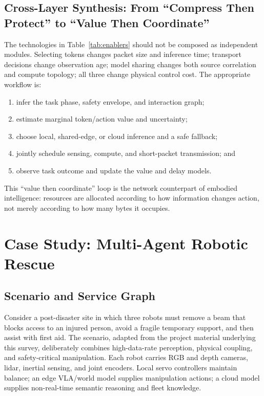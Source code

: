 \documentclass[letterpaper,journal]{IEEEtran}
\begin{document}
\subsection{Cross-Layer Synthesis: From ``Compress Then Protect'' to ``Value Then Coordinate''}
The technologies in Table~\ref{tab:enablers} should not be composed as
independent modules. Selecting tokens changes packet size and inference time;
transport decisions change observation age; model sharing changes both source
correlation and compute topology; all three change physical control cost.
The appropriate workflow is:
\begin{enumerate}
\item infer the task phase, safety envelope, and interaction graph;
\item estimate marginal token/action value and uncertainty;
\item choose local, shared-edge, or cloud inference and a safe fallback;
\item jointly schedule sensing, compute, and short-packet transmission; and
\item observe task outcome and update the value and delay models.
\end{enumerate}
This ``value then coordinate'' loop is the network counterpart of embodied
intelligence: resources are allocated according to how information changes
action, not merely according to how many bytes it occupies.

\section{Case Study: Multi-Agent Robotic Rescue}
\label{sec:case}

\subsection{Scenario and Service Graph}
Consider a post-disaster site in which three robots must remove a beam that
blocks access to an injured person, avoid a fragile temporary support, and
then assist with first aid. The scenario, adapted from the project material
underlying this survey, deliberately combines high-data-rate perception,
physical coupling, and safety-critical manipulation. Each robot carries RGB
and depth cameras, lidar, inertial sensing, and joint encoders. Local servo
controllers maintain balance; an edge VLA/world model supplies manipulation
actions; a cloud model supplies non-real-time semantic reasoning and fleet
knowledge.
\end{document}
